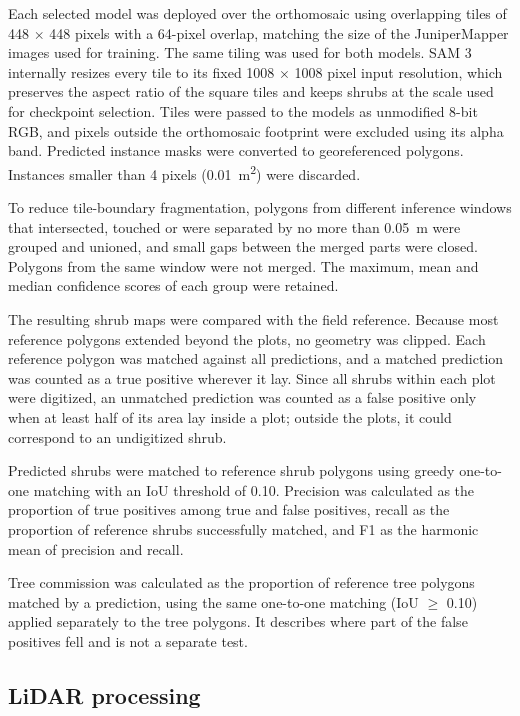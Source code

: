 \documentclass[12pt,a4paper]{article}
\begin{document}
Each selected model was deployed over the orthomosaic using overlapping tiles of 448 $\times$ 448 pixels with a 64-pixel overlap, matching the size of the JuniperMapper images used for training. The same tiling was used for both models. SAM 3 internally resizes every tile to its fixed 1008 $\times$ 1008 pixel input resolution, which preserves the aspect ratio of the square tiles and keeps shrubs at the scale used for checkpoint selection. Tiles were passed to the models as unmodified 8-bit RGB, and pixels outside the orthomosaic footprint were excluded using its alpha band. Predicted instance masks were converted to georeferenced polygons. Instances smaller than 4 pixels (\qty{0.01}{\square\metre}) were discarded.

To reduce tile-boundary fragmentation, polygons from different inference windows that intersected, touched or were separated by no more than \qty{0.05}{\metre} were grouped and unioned, and small gaps between the merged parts were closed. Polygons from the same window were not merged. The maximum, mean and median confidence scores of each group were retained.

The resulting shrub maps were compared with the field reference. Because most reference polygons extended beyond the plots, no geometry was clipped. Each reference polygon was matched against all predictions, and a matched prediction was counted as a true positive wherever it lay. Since all shrubs within each plot were digitized, an unmatched prediction was counted as a false positive only when at least half of its area lay inside a plot; outside the plots, it could correspond to an undigitized shrub.

Predicted shrubs were matched to reference shrub polygons using greedy one-to-one matching with an IoU threshold of 0.10. Precision was calculated as the proportion of true positives among true and false positives, recall as the proportion of reference shrubs successfully matched, and F1 as the harmonic mean of precision and recall.

Tree commission was calculated as the proportion of reference tree polygons matched by a prediction, using the same one-to-one matching (IoU $\geq$ 0.10) applied separately to the tree polygons. It describes where part of the false positives fell and is not a separate test.

\subsection{LiDAR processing}
\end{document}
